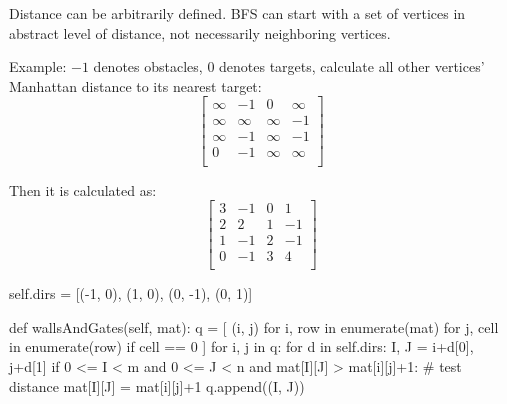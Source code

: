 Distance can be arbitrarily defined. BFS can start with a set of vertices in abstract level of distance, not necessarily neighboring vertices.

Example: $-1$ denotes obstacles, $0$ denotes targets, calculate all other vertices' Manhattan distance to its nearest target:
$$
\begin{bmatrix}
\infty & -1 & 0 & \infty \\
\infty & \infty & \infty & -1 \\
\infty & -1 & \infty & -1 \\
0 & -1 & \infty & \infty \\
\end{bmatrix}
$$

Then it is calculated as:
$$
\begin{bmatrix}
3 & -1 & 0 & 1 \\
2 & 2 & 1 & -1 \\
1 & -1 & 2 & -1 \\
0 & -1 & 3 & 4 \\
\end{bmatrix}
$$

\begin{python}
self.dirs = [(-1, 0), (1, 0), (0, -1), (0, 1)]

def wallsAndGates(self, mat):
  q = [
    (i, j) 
    for i, row in enumerate(mat)
    for j, cell in enumerate(row) 
    if cell == 0
  ]
  for i, j in q:
    for d in self.dirs:
      I, J = i+d[0], j+d[1]
      if 0 <= I < m and 0 <= J < n 
        and mat[I][J] > mat[i][j]+1:  # test distance
        mat[I][J] = mat[i][j]+1
        q.append((I, J))
\end{python}


